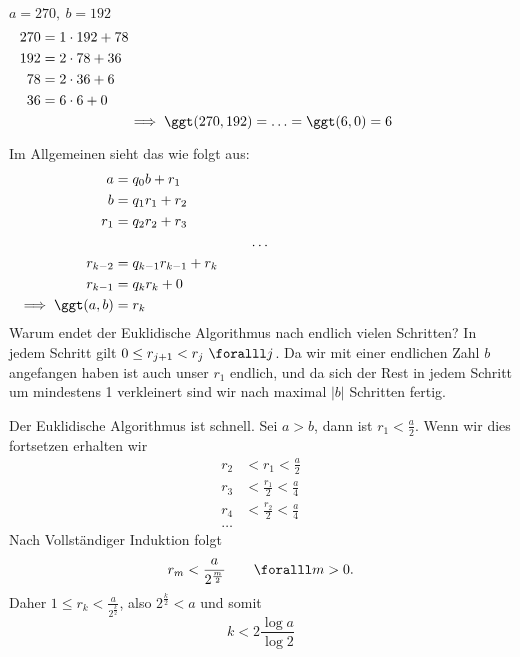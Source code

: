 \begin{exmp*}
	$a = 270,\ b = 192$
	\begin{align*}
		270 &= 1 \cdot 192 + 78\\
		192 &= 2 \cdot 78 + 36\\
		78 &= 2 \cdot 36 + 6\\
		36 &= 6 \cdot 6 + 0\\
		\noalign{\centering $\implies \ggt(270,192) = \dotsc = \ggt(6,0) = 6$}
	\end{align*}
\end{exmp*}

Im Allgemeinen sieht das wie folgt aus:
\begin{align*}
	a &= q_0 b + r_1\\
	b &= q_1 r_1 + r_2\\
	r_1 &= q_2 r_2 + r_3\\
	\noalign{\centering \dots}
	r_{k-2} &= q_{k-1} r_{k-1} + r_k\\
	r_{k-1} &= q_k r_k + 0\\
	\implies \ggt(a,b) &= r_k
\end{align*}
Warum endet der Euklidische Algorithmus nach endlich vielen Schritten? In jedem Schritt gilt $0 \leq r_{j+1} < r_j \ \foralll j$. Da wir mit einer endlichen Zahl $b$ angefangen haben ist auch unser $r_1$ endlich, und da sich der Rest in jedem Schritt um mindestens 1 verkleinert sind wir nach maximal $|b|$ Schritten fertig.

Der Euklidische Algorithmus ist schnell. Sei $a > b$, dann ist $r_1 < \frac{a}{2}$. Wenn wir dies fortsetzen erhalten wir 
\begin{align*}
	r_2 &< r_1 < \frac{a}{2}\\
	r_3 &< \frac{r_1}{2} < \frac{a}{4}\\
	r_4 &< \frac{r_2}{2} < \frac{a}{4}\\
	\dots
\end{align*}
Nach Vollständiger Induktion folgt 
\[ r_m < \frac{a}{2^{\frac{m}{2}}}\qquad \foralll m>0. \]
Daher \( 1 \leq r_k < \frac{a}{2^{\frac{k}{2}}} \), also \( 2^\frac{k}{2} < a \) und somit
\[ k < 2\frac{\log a}{\log 2} \]
